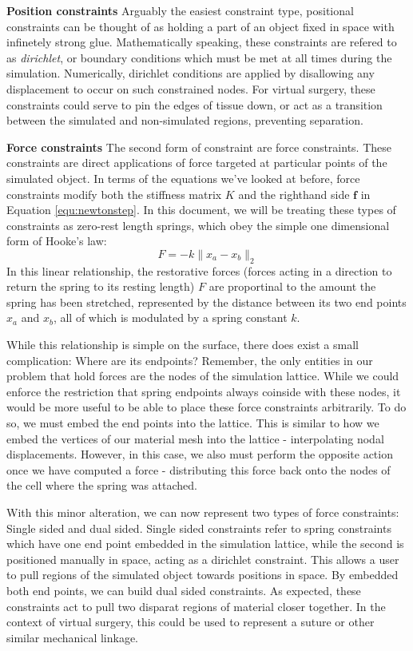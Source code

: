 \documentclass[12pt,oneside,letterpaper]{memoir}
\begin{document}
  \textbf{Position constraints} Arguably the easiest constraint type,
  positional constraints can be thought of as holding a part of an
  object fixed in space with infinetely strong glue. Mathematically
  speaking, these constraints are refered to as \textit{dirichlet}, or
  boundary conditions which must be met at all times during the
  simulation. Numerically, dirichlet conditions are applied by
  disallowing any displacement to occur on such constrained nodes. For
  virtual surgery, these constraints could serve to pin the edges of
  tissue down, or act as a transition between the simulated and
  non-simulated regions, preventing separation. 

  \textbf{Force constraints} The second form of constraint are force
  constraints. These constraints are direct applications of force
  targeted at particular points of the simulated object. In terms of
  the equations we've looked at before, force constraints modify both
  the stiffness matrix $K$ and the righthand side $\mathbf f$ in
  Equation \ref{equ:newtonstep}. In this document, we will be treating
  these types of constraints as zero-rest length springs, which obey
  the simple one dimensional form of Hooke's law:
  \begin{equation}
    \label{equ:hookeslaw}
    F = -k\lVert x_a - x_b\rVert_2
  \end{equation}
  In this linear relationship, the restorative forces (forces acting
  in a direction to return the spring to its resting length) $F$ are proportinal to the
  amount the spring has been stretched, represented by the distance
  between its two end points $x_a$ and $x_b$, all of which is
  modulated by a spring constant $k$.

  While this relationship is simple on the surface, there does exist a
  small complication: Where are its endpoints? Remember, the only
  entities in our problem that hold forces are the nodes of the
  simulation lattice. While we could enforce the restriction that
  spring endpoints always coinside with these nodes, it would be more
  useful to be able to place these force constraints arbitrarily. To
  do so, we must embed the end points into the lattice. This is
  similar to how we embed the vertices of our material mesh into the
  lattice - interpolating nodal displacements. However, in this case,
  we also must perform the opposite action once we have computed a
  force - distributing this force back onto the nodes of the cell
  where the spring was attached.

  With this minor alteration, we can now represent two types of force
  constraints: Single sided and dual sided. Single sided constraints
  refer to spring constraints which have one end point embedded in the
  simulation lattice, while the second is positioned manually in
  space, acting as a dirichlet constraint. This allows a user to pull
  regions of the simulated object towards positions in space. By
  embedded both end points, we can build dual sided constraints. As
  expected, these constraints act to pull two disparat regions of
  material closer together. In the context of virtual surgery, this
  could be used to represent a suture or other similar mechanical linkage.
  
\end{document}
